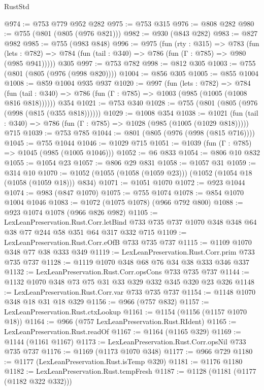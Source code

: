 \begin{lexlean}{RustStd}
\begin{coremodule}
@974 := @753 @779 @952 @282
@975 := @753 @315
@976 := @808 @282
@980 := @755 (@801 (@805 (@976 @821)))
@982 := @930 (@843 @282)
@983 := @827 @982
@985 := @755 (@983 @848)
@996 := @975
    (fun (rty : @315) =>
    @783
      (fun (lets : @782) => @784 (fun (tail : @340) => @786 (fun (Γ : @785) => @980 (@985 @941)))))
    @305
@997 := @753 @782
@998 := @812 @305
@1003 := @755 (@801 (@805 (@976 (@998 @820))))
@1004 := @856 @305
@1005 := @855 @1004
@1008 := @859 @1004 @935 @937
@1020 := @997
    (fun (lets : @782) =>
    @784 (fun (tail : @340) => @786 (fun (Γ : @785) => @1003 (@985 (@1005 (@1008 @816 @818))))))
    @354
@1021 := @753 @340
@1028 := @755 (@801 (@805 (@976 (@998 (@815 (@355 @818))))))
@1029 := @1008 @354
@1038 := @1021
    (fun (tail : @340) => @786 (fun (Γ : @785) => @1028 (@985 (@1005 (@1029 @818)))))
    @715
@1039 := @753 @785
@1044 := @801 (@805 (@976 (@998 (@815 @716))))
@1045 := @755 @1044
@1046 := @1029 @715
@1051 := @1039 (fun (Γ : @785) => @1045 (@985 (@1005 @1046)))
@1052 := @6 @833
@1054 := @806 @10 @832
@1055 := @1054 @23
@1057 := @806 @29 @831
@1058 := @1057 @31
@1059 := @314 @10
@1070 := @1052 (@1055 (@1058 (@1059 @23))) (@1052 (@1054 @18 (@1058 (@1059 @18))) @834)
@1071 := @1051 @1070
@1072 := @923 @1044
@1074 := @983 (@847 @1070)
@1075 := @755 @1074
@1078 := @854 @1070 @1004 @1046
@1083 := @1072 (@1075 @1078) (@966 @792 @800)
@1088 := @923 @1074 @1078 (@966 @826 @982)
@1105 := LexLeanPreservation.Rust.Corr.letBind
    @733
    @735
    @737
    @1070
    @348
    @348
    @64
    @38
    @77
    @244
    @58
    @351
    @64
    @317
    @332
    @715
@1109 := LexLeanPreservation.Rust.Corr.eOfB @733 @735 @737
@1115 := @1109 @1070 @348 @77 @38 @333 @349
@1119 := LexLeanPreservation.Rust.Corr.prim @733 @735 @737
@1128 := @1119 @1070 @348 @68 @76 @34 @38 @333 @346 @337
@1132 := LexLeanPreservation.Rust.Corr.opsCons @733 @735 @737
@1144 := @1132 @1070 @348 @73 @75 @31 @33 @329 @332 @345 @320 @23 @326
@1148 := LexLeanPreservation.Rust.Corr.var @733 @735 @737
@1154 := @1148 @1070 @348 @18 @31 @18 @329
@1156 := @966 (@757 @832)
@1157 := LexLeanPreservation.Rust.ctxLookup
@1161 := @1154 (@1156 (@1157 @1070 @18))
@1164 := @966 (@757 LexLeanPreservation.Rust.RIdent)
@1165 := LexLeanPreservation.Rust.readOf
@1167 := @1164 (@1165 @329)
@1169 := @1144 (@1161 @1167)
@1173 := LexLeanPreservation.Rust.Corr.opsNil @733 @735 @737
@1176 := @1169 (@1173 @1070 @348)
@1177 := @966 @729
@1180 := @1177 (LexLeanPreservation.Rust.isTemp @320)
@1181 := @1176 @1180
@1182 := LexLeanPreservation.Rust.tempFresh
@1187 := @1128 (@1181 (@1177 (@1182 @322 @332)))

\end{coremodule}
\end{lexlean}
